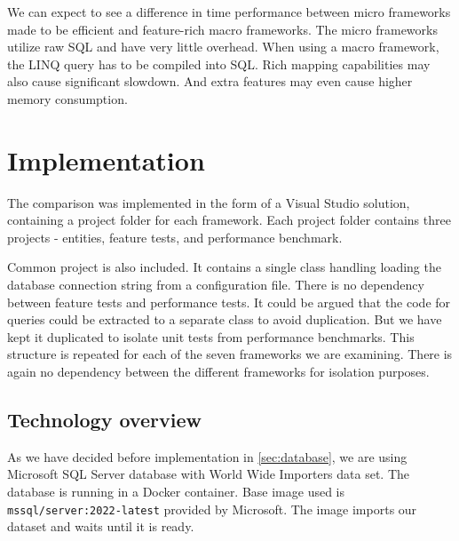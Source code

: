We can expect to see a difference in time performance between micro frameworks made to be efficient and feature-rich macro frameworks.
The micro frameworks utilize raw SQL and have very little overhead. When using a macro framework, the LINQ query has to be compiled into SQL. Rich mapping capabilities may also cause significant slowdown. And extra features may even cause higher memory consumption.

\section{Implementation}
The comparison was implemented in the form of a Visual Studio solution, containing a project folder for each framework. Each project folder contains three projects - entities, feature tests, and performance benchmark. 


\usetikzlibrary{positioning, arrows}
\begin{center}
\end{center}

Common project is also included. It contains a single class handling loading the database connection string from a configuration file. There is no dependency between feature tests and performance tests. It could be argued that the code for queries could be extracted to a separate class to avoid duplication. But we have kept it duplicated to isolate unit tests from performance benchmarks. This structure is repeated for each of the seven frameworks we are examining. There is again no dependency between the different frameworks for isolation purposes.

\subsection{Technology overview}
As we have decided before implementation in \autoref{sec:database}, we are using Microsoft SQL Server database with World Wide Importers data set. The database is running in a Docker container. Base image used is \texttt{mssql/server:2022-latest}\cite{mssqlDocker} provided by Microsoft. The image imports our dataset and waits until it is ready.

